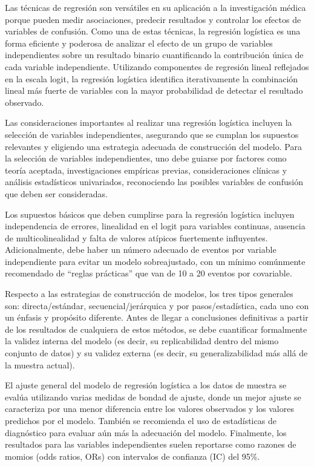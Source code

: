 \documentclass[12pt]{article}
\begin{document}
Las técnicas de regresión son versátiles en su aplicación a la investigación médica porque pueden medir asociaciones, predecir resultados y controlar los efectos de variables de confusión. Como una de estas técnicas, la regresión logística es una forma eficiente y poderosa de analizar el efecto de un grupo de variables independientes sobre un resultado binario cuantificando la contribución única de cada variable independiente. Utilizando componentes de regresión lineal reflejados en la escala logit, la regresión logística identifica iterativamente la combinación lineal más fuerte de variables con la mayor probabilidad de detectar el resultado observado.

Las consideraciones importantes al realizar una regresión logística incluyen la selección de variables independientes, asegurando que se cumplan los supuestos relevantes y eligiendo una estrategia adecuada de construcción del modelo. Para la selección de variables independientes, uno debe guiarse por factores como teoría aceptada, investigaciones empíricas previas, consideraciones clínicas y análisis estadísticos univariados, reconociendo las posibles variables de confusión que deben ser consideradas. 

Los supuestos básicos que deben cumplirse para la regresión logística incluyen independencia de errores, linealidad en el logit para variables continuas, ausencia de multicolinealidad y falta de valores atípicos fuertemente influyentes. Adicionalmente, debe haber un número adecuado de eventos por variable independiente para evitar un modelo sobreajustado, con un mínimo comúnmente recomendado de “reglas prácticas” que van de 10 a 20 eventos por covariable.

Respecto a las estrategias de construcción de modelos, los tres tipos generales son: directa/estándar, secuencial/jerárquica y por pasos/estadística, cada uno con un énfasis y propósito diferente. Antes de llegar a conclusiones definitivas a partir de los resultados de cualquiera de estos métodos, se debe cuantificar formalmente la validez interna del modelo (es decir, su replicabilidad dentro del mismo conjunto de datos) y su validez externa (es decir, su generalizabilidad más allá de la muestra actual).

El ajuste general del modelo de regresión logística a los datos de muestra se evalúa utilizando varias medidas de bondad de ajuste, donde un mejor ajuste se caracteriza por una menor diferencia entre los valores observados y los valores predichos por el modelo. También se recomienda el uso de estadísticas de diagnóstico para evaluar aún más la adecuación del modelo. Finalmente, los resultados para las variables independientes suelen reportarse como razones de momios (odds ratios, ORs) con intervalos de confianza (IC) del 95\%.
\end{document}
